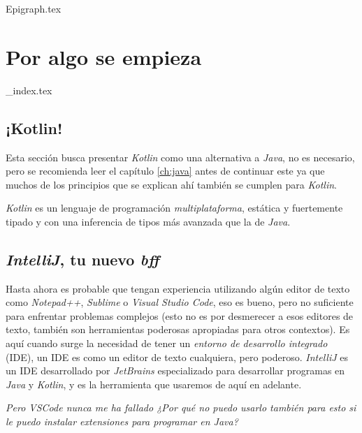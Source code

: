 {Epigraph.tex}
\part{Por algo se empieza}
  {_index.tex}
  
  \chapter{¡Kotlin!}
    Esta sección busca presentar \textit{Kotlin} como una alternativa a \textit{Java}, no es 
    necesario, pero se recomienda leer el capítulo \ref{ch:java} antes de continuar este ya que 
    muchos de los principios que se explican ahí también se cumplen para \textit{Kotlin}.
    
    \textit{Kotlin} es un lenguaje de programación \textit{multiplataforma}, estática y fuertemente 
    tipado y con una inferencia de tipos más avanzada que la de \textit{Java}.
  
    \chapter{\textit{IntelliJ}, tu nuevo \textit{bff}}
      Hasta ahora es probable que tengan experiencia utilizando algún editor de texto como 
      \textit{Notepad++}, \textit{Sublime} o \textit{Visual Studio Code}, eso es bueno, pero no 
      suficiente para enfrentar problemas complejos (esto no es por desmerecer a esos editores de 
      texto, también son herramientas poderosas apropiadas para otros contextos).
      Es aquí cuando surge la necesidad de tener un \textit{entorno de desarrollo integrado} (IDE),
      un IDE es como un editor de texto cualquiera, pero poderoso.
      \textit{IntelliJ} es un IDE desarrollado por \textit{JetBrains} especializado para desarrollar
      programas en \textit{Java} y \textit{Kotlin}, y es la herramienta que usaremos de aquí en
      adelante.
      \begin{center}
        \textit{
          Pero VSCode nunca me ha fallado ¿Por qué no puedo usarlo también para esto si le puedo 
          instalar extensiones para programar en Java?
        }
      \end{center}

  \nocite{*}
